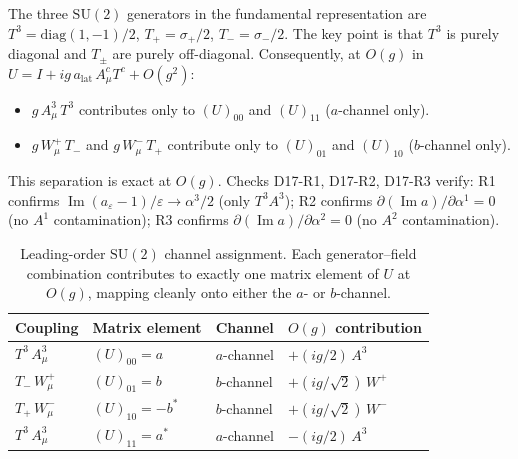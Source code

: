\documentclass[12pt]{article}
\numberwithin{equation}{section}
\theoremstyle{plain}
\theoremstyle{definition}
\theoremstyle{remark}
\newcommand{\su}{\mathrm{SU}}              %
\begin{document}
	The three $\su(2)$ generators in the fundamental representation are
	$T^{3} = \mathrm{diag}(1,-1)/2$, $T_{+} = \sigma_{+}/2$,
	$T_{-} = \sigma_{-}/2$.  The key point is that $T^{3}$ is purely
	diagonal and $T_{\pm}$ are purely off-diagonal.  Consequently, at
	$O(g)$ in $U = I + i g\,a_{\mathrm{lat}}\,A^{c}_{\mu} T^{c} + O(g^{2})$:
	
	\begin{itemize}
		\item $g\,A^{3}_{\mu}\,T^{3}$ contributes only to $(U)_{00}$ and
		$(U)_{11}$ ($a$-channel only).
		
		\item $g\,W^{+}_{\mu}\,T_{-}$ and $g\,W^{-}_{\mu}\,T_{+}$
		contribute only to $(U)_{01}$ and $(U)_{10}$ ($b$-channel only).
	\end{itemize}
	
	This separation is exact at $O(g)$.  Checks D17-R1, D17-R2, D17-R3
	verify: R1 confirms
	$\operatorname{Im}(a_\varepsilon - 1)/\varepsilon \to \alpha^{3}/2$
	(only $T^{3} A^{3}$); R2 confirms
	$\partial(\operatorname{Im} a)/\partial \alpha^{1} = 0$
	(no $A^{1}$ contamination); R3 confirms
	$\partial(\operatorname{Im} a)/\partial \alpha^{2} = 0$
	(no $A^{2}$ contamination).
	
	\begin{table}[ht]
		\centering
		\caption{Leading-order $\su(2)$ channel assignment.  Each
			generator--field combination contributes to exactly one
			matrix element of $U$ at $O(g)$, mapping cleanly onto either
			the $a$- or $b$-channel.}
		\label{tab:Og-channel-assignment}
		\small
		\setlength{\tabcolsep}{8pt}
		\begin{tabular}{@{}llll@{}}
			\toprule
			\textbf{Coupling} & \textbf{Matrix element}
			& \textbf{Channel} & \textbf{$O(g)$ contribution}\\
			\midrule
			$T^{3}\,A^{3}_{\mu}$ & $(U)_{00} = a$
			& $a$-channel & $+(ig/2)\,A^{3}$\\
			$T_{-}\,W^{+}_{\mu}$ & $(U)_{01} = b$
			& $b$-channel & $+(ig/\sqrt{2})\,W^{+}$\\
			$T_{+}\,W^{-}_{\mu}$ & $(U)_{10} = -b^{*}$
			& $b$-channel & $+(ig/\sqrt{2})\,W^{-}$\\
			$T^{3}\,A^{3}_{\mu}$ & $(U)_{11} = a^{*}$
			& $a$-channel & $-(ig/2)\,A^{3}$\\
			\bottomrule
		\end{tabular}
	\end{table}
	
\end{document}
